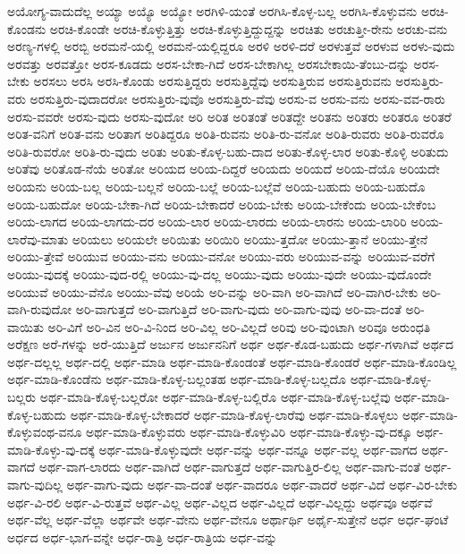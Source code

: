 {ಅಯೋಗ್ಯ-ವಾದುದೆಲ್ಲ
ಅಯ್ಯಾ
ಅಯ್ಯೊ
ಅಯ್ಯೋ
ಅರಗಿಳಿ-ಯಂತೆ
ಅರಗಿಸಿ-ಕೊಳ್ಳ-ಬಲ್ಲ
ಅರಗಿಸಿ-ಕೊಳ್ಳುವನು
ಅರಚಿ-ಕೊಂಡನು
ಅರಚಿ-ಕೊಂಡೇ
ಅರಚಿ-ಕೊಳ್ಳುತ್ತಿತ್ತು
ಅರಚಿ-ಕೊಳ್ಳುತ್ತಿದ್ದುದ್ದನ್ನು
ಅರಚಿತು
ಅರಚುತ್ತೀ-ರೇನು
ಅರಚು-ವನು
ಅರಣ್ಯ-ಗಳಲ್ಲಿ
ಅರಬ್ಬಿ
ಅರಮನೆ-ಯಲ್ಲಿ
ಅರಮನೆ-ಯಲ್ಲಿದ್ದರೂ
ಅರಳಿ
ಅರಳಿ-ದರೆ
ಅರಳುತ್ತವೆ
ಅರಳುವ
ಅರಳು-ವುದು
ಅರವತ್ತು
ಅರವತ್ತೋ
ಅರಸ-ಕೂಡದು
ಅರಸ-ಬೇಕಾ-ಗಿದೆ
ಅರಸ-ಬೇಕಾಗಿಲ್ಲ
ಅರಸಬೇಕಾಯಿ-ತೆಂಬು-ದನ್ನು
ಅರಸ-ಬೇಕು
ಅರಸಲು
ಅರಸಿ
ಅರಸಿ-ಕೊಂಡು
ಅರಸುತ್ತಿದ್ದರು
ಅರಸುತ್ತಿದ್ದೆವು
ಅರಸುತ್ತಿರುವ
ಅರಸುತ್ತಿರುವನು
ಅರಸುತ್ತಿರು-ವರು
ಅರಸುತ್ತಿರು-ವುದಾದರೋ
ಅರಸುತ್ತಿರು-ವುವೊ
ಅರಸುತ್ತಿರು-ವೆವು
ಅರಸು-ವ
ಅರಸು-ವನು
ಅರಸು-ವವ-ರಾರು
ಅರಸು-ವವರೇ
ಅರಸು-ವುದು
ಅರಸು-ವುದೋ
ಅರಿ
ಅರಿತ
ಅರಿತಂತೆ
ಅರಿತದ್ದೇ
ಅರಿತನು
ಅರಿತರು
ಅರಿತರೂ
ಅರಿತರೆ
ಅರಿತ-ವನಿಗೆ
ಅರಿತ-ವನು
ಅರಿತಾಗ
ಅರಿತಿದ್ದರೂ
ಅರಿತಿ-ರುವನು
ಅರಿತಿ-ರು-ವನೋ
ಅರಿತಿ-ರುವರು
ಅರಿತಿ-ರುವರೊ
ಅರಿತಿ-ರುವರೋ
ಅರಿತಿ-ರು-ವುದು
ಅರಿತು
ಅರಿತು-ಕೊಳ್ಳ-ಬಹು-ದಾದ
ಅರಿತು-ಕೊಳ್ಳ-ಲಾರ
ಅರಿತು-ಕೊಳ್ಳಿ
ಅರಿತುದು
ಅರಿತೆವು
ಅರಿತೊಡ-ನೆಯೆ
ಅರಿತೋ
ಅರಿಯದ
ಅರಿಯ-ದಿದ್ದರೆ
ಅರಿಯದು
ಅರಿಯದೆ
ಅರಿಯ-ದೆಯೊ
ಅರಿಯದೇ
ಅರಿಯನು
ಅರಿಯ-ಬಲ್ಲ
ಅರಿಯ-ಬಲ್ಲನೆ
ಅರಿಯ-ಬಲ್ಲೆ
ಅರಿಯ-ಬಲ್ಲೆವೆ
ಅರಿಯ-ಬಹುದು
ಅರಿಯ-ಬಹುದೊ
ಅರಿಯ-ಬಹುದೋ
ಅರಿಯ-ಬೇಕಾ-ಗಿದೆ
ಅರಿಯ-ಬೇಕಾದರೆ
ಅರಿಯ-ಬೇಕು
ಅರಿಯ-ಬೇಕೆಂದು
ಅರಿಯ-ಬೇಕೆಂಬ
ಅರಿಯ-ಲಾಗದ
ಅರಿಯ-ಲಾಗದು-ದರ
ಅರಿಯ-ಲಾರ
ಅರಿಯ-ಲಾರದು
ಅರಿಯ-ಲಾರನು
ಅರಿಯ-ಲಾರಿರಿ
ಅರಿಯ-ಲಾರೆವು-ಮಾತು
ಅರಿಯಲು
ಅರಿಯಲೇ
ಅರಿಯಿತು
ಅರಿಯಿರಿ
ಅರಿಯು-ತ್ತದೋ
ಅರಿಯು-ತ್ತಾನೆ
ಅರಿಯು-ತ್ತೇನೆ
ಅರಿಯು-ತ್ತೇವೆ
ಅರಿಯುವ
ಅರಿಯು-ವನು
ಅರಿಯು-ವನೋ
ಅರಿಯು-ವರು
ಅರಿಯುವ-ವನ್ನು
ಅರಿಯುವ-ವರೆಗೆ
ಅರಿಯು-ವುದಕ್ಕೆ
ಅರಿಯು-ವುದ-ರಲ್ಲಿ
ಅರಿಯು-ವು-ದಲ್ಲ
ಅರಿಯು-ವುದು
ಅರಿಯು-ವುದೇ
ಅರಿಯು-ವುದೊಂದೇ
ಅರಿಯುವೆ
ಅರಿಯು-ವೆನೊ
ಅರಿಯು-ವೆವು
ಅರಿಯೆ
ಅರಿ-ವನ್ನು
ಅರಿ-ವಾಗಿ
ಅರಿ-ವಾಗಿದೆ
ಅರಿ-ವಾಗಿರ-ಬೇಕು
ಅರಿ-ವಾಗಿ-ರುವುದೋ
ಅರಿ-ವಾಗುತ್ತದೆ
ಅರಿ-ವಾಗುತ್ತಿದೆ
ಅರಿ-ವಾಗು-ವುದು
ಅರಿ-ವಾಗು-ವುವು
ಅರಿ-ವಾ-ದಂತೆ
ಅರಿ-ವಾಯಿತು
ಅರಿ-ವಿಗೆ
ಅರಿ-ವಿನ
ಅರಿ-ವಿ-ನಿಂದ
ಅರಿ-ವಿಲ್ಲ
ಅರಿ-ವಿಲ್ಲದೆ
ಅರಿವು
ಅರಿ-ವುಂಟಾಗಿ
ಅರಿವೂ
ಅರುಂಧತಿ
ಅರೆಕ್ಷಣ
ಅರೆ-ಗಳನ್ನು
ಅರೆ-ಯುತ್ತಿದೆ
ಅರ್ಜುನ
ಅರ್ಜುನನಿಗೆ
ಅರ್ಥ
ಅರ್ಥ-ಕೊಡ-ಬಹುದು
ಅರ್ಥ-ಗಳಾಗಿವೆ
ಅರ್ಥದ
ಅರ್ಥ-ದಲ್ಲಲ್ಲ
ಅರ್ಥ-ದಲ್ಲಿ
ಅರ್ಥ-ಮಾಡಿ
ಅರ್ಥ-ಮಾಡಿ-ಕೊಂಡಂತೆ
ಅರ್ಥ-ಮಾಡಿ-ಕೊಂಡರೆ
ಅರ್ಥ-ಮಾಡಿ-ಕೊಂಡಿಲ್ಲ
ಅರ್ಥ-ಮಾಡಿ-ಕೊಂಡೆನು
ಅರ್ಥ-ಮಾಡಿ-ಕೊಳ್ಳ-ಬಲ್ಲಂತಹ
ಅರ್ಥ-ಮಾಡಿ-ಕೊಳ್ಳ-ಬಲ್ಲದೊ
ಅರ್ಥ-ಮಾಡಿ-ಕೊಳ್ಳ-ಬಲ್ಲರು
ಅರ್ಥ-ಮಾಡಿ-ಕೊಳ್ಳ-ಬಲ್ಲರೋ
ಅರ್ಥ-ಮಾಡಿ-ಕೊಳ್ಳ-ಬಲ್ಲಿರೊ
ಅರ್ಥ-ಮಾಡಿ-ಕೊಳ್ಳ-ಬಲ್ಲೆವು
ಅರ್ಥ-ಮಾಡಿ-ಕೊಳ್ಳ-ಬಹುದು
ಅರ್ಥ-ಮಾಡಿ-ಕೊಳ್ಳ-ಬೇಕಾದರೆ
ಅರ್ಥ-ಮಾಡಿ-ಕೊಳ್ಳ-ಲಾರೆವು
ಅರ್ಥ-ಮಾಡಿ-ಕೊಳ್ಳಲು
ಅರ್ಥ-ಮಾಡಿ-ಕೊಳ್ಳುವಂಥ-ವನೂ
ಅರ್ಥ-ಮಾಡಿ-ಕೊಳ್ಳುವರು
ಅರ್ಥ-ಮಾಡಿ-ಕೊಳ್ಳುವಿರಿ
ಅರ್ಥ-ಮಾಡಿ-ಕೊಳ್ಳು-ವು-ದಕ್ಕೂ
ಅರ್ಥ-ಮಾಡಿ-ಕೊಳ್ಳು-ವು-ದಕ್ಕೆ
ಅರ್ಥ-ಮಾಡಿ-ಕೊಳ್ಳುವುದೇ
ಅರ್ಥ-ವನ್ನು
ಅರ್ಥ-ವನ್ನೂ
ಅರ್ಥ-ವಲ್ಲ
ಅರ್ಥ-ವಾಗದ
ಅರ್ಥ-ವಾಗದೆ
ಅರ್ಥ-ವಾಗ-ಲಾರದು
ಅರ್ಥ-ವಾಗಿದೆ
ಅರ್ಥ-ವಾಗುತ್ತದೆ
ಅರ್ಥ-ವಾಗುತ್ತಿರ-ಲಿಲ್ಲ
ಅರ್ಥ-ವಾಗು-ವಂತೆ
ಅರ್ಥ-ವಾಗು-ವುದಿಲ್ಲ
ಅರ್ಥ-ವಾಗು-ವುದು
ಅರ್ಥ-ವಾ-ದಂತೆ
ಅರ್ಥ-ವಾದರೂ
ಅರ್ಥ-ವಾದರೆ
ಅರ್ಥ-ವಿದೆ
ಅರ್ಥ-ವಿರ-ಬೇಕು
ಅರ್ಥ-ವಿ-ರಲಿ
ಅರ್ಥ-ವಿ-ರುತ್ತವೆ
ಅರ್ಥ-ವಿಲ್ಲ
ಅರ್ಥ-ವಿಲ್ಲದ
ಅರ್ಥ-ವಿಲ್ಲದೆ
ಅರ್ಥ-ವಿಲ್ಲದ್ದು
ಅರ್ಥವೂ
ಅರ್ಥವೆ
ಅರ್ಥ-ವೆಲ್ಲ
ಅರ್ಥ-ವೆಲ್ಲಾ
ಅರ್ಥವೇ
ಅರ್ಥ-ವೇನು
ಅರ್ಥ-ವೇನೂ
ಅರ್ಥಾರ್ಥಿ
ಅರ್ಥೈ-ಸುತ್ತೇನೆ
ಅರ್ಧ
ಅರ್ಧ-ಘಂಟೆ
ಅರ್ಧದ
ಅರ್ಧ-ಭಾಗ-ವನ್ನೇ
ಅರ್ಧ-ರಾತ್ರಿ
ಅರ್ಧ-ರಾತ್ರಿಯ
ಅರ್ಧ-ವನ್ನು
}
